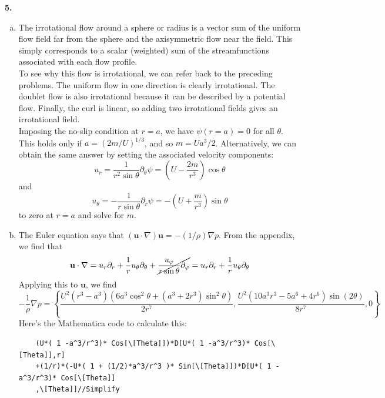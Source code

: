 \documentclass[11pt]{article}
\newcommand{\f}[2]{\frac{#1}{#2}}
\newcommand{\p}{\partial}%
\begin{document}
\noindent \textbf{5.} 
\begin{enumerate}[(a)]
	\item The irrotational flow around a sphere or radius is a vector sum of the uniform flow field far from the sphere and the axisymmetric flow near the field. This simply corresponds to a scalar (weighted) sum of the streamfunctions associated with each flow profile. \\
	
	
	To see why this flow is irrotational, we can refer back to the preceding problems. The uniform flow in one direction is clearly irrotational. The doublet flow is also irrotational because it can be described by a potential flow. Finally, the curl is linear, so adding two irrotational fields gives an irrotational field. \\
	

	Imposing the no-slip condition at $r=a$, we have $\psi(r=a) = 0$ for all $\theta$. This holds only if $a = (2m/U)^{1/3}$, and so $\boxed{m = U a^3/2}$. Alternatively,  we can obtain the same answer by setting  the associated velocity components:
	\begin{equation*}
	u_r = \f{1}{r^2\sin\theta}\p_\theta \psi = \left(  U-\f{2m}{r^3} \right) \cos\theta
	\end{equation*}
	and 
	\begin{equation*}
	u_\theta = -\f{1}{r\sin\theta}\p_r\psi = -\left(U + \f{m}{r^3} \right)\sin\theta
	\end{equation*}
	to zero at $r=a$ and solve for $m$. 
	
	
	\item The Euler equation says that $(\mathbf{u}\cdot \nabla)\mathbf{u} = -(1/\rho)\nabla p$. From the appendix, we find that
	\begin{equation*}
	\mathbf{u}\cdot \nabla  = u_r \p_r + \f{1}{r}u_\theta \p_\theta + \cancel{\f{u_\varphi}{r\sin\theta} \p_\varphi} = u_r \p_r + \f{1}{r}u_\theta \p_\theta
	\end{equation*}
	Applying this to $\mathbf{u}$, we find 
	\begin{equation*}
	-\f{1}{\rho}\nabla p = \left\{
	 \frac{U^2\left(r^3-a^3\right)\left(6a^3\cos^2\theta+\left(a^3+2r^3\right)\sin^2\theta\right)}{2r^7}, \frac{U^2\left(10a^3r^3-5a^6+4r^6\right)\sin(2\theta)}{8r^7} , 0
	\right\}
	\end{equation*}
	Here's the Mathematica code to calculate this:
	\begin{lstlisting}
	(U*( 1 -a^3/r^3)* Cos[\[Theta]])*D[U*( 1 -a^3/r^3)* Cos[\[Theta]],r]
	+(1/r)*(-U*( 1 + (1/2)*a^3/r^3 )* Sin[\[Theta]])*D[U*( 1 -a^3/r^3)* Cos[\[Theta]]
	,\[Theta]]//Simplify
	

\end{lstlisting}
\end{enumerate}
\end{document}

